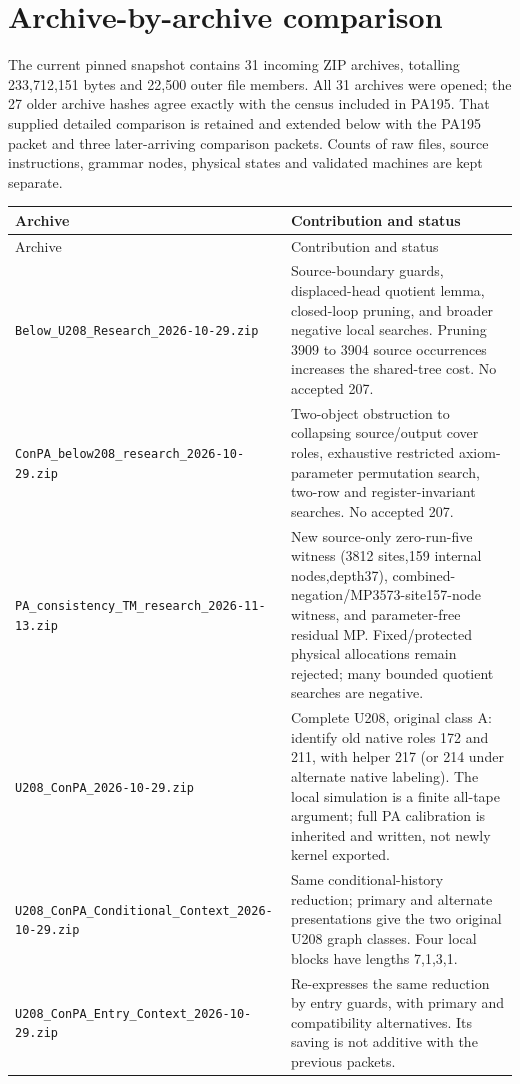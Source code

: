 \section{Archive-by-archive comparison}
The current pinned snapshot contains 31 incoming ZIP archives, totalling
233,712,151 bytes and 22,500 outer file members. All 31 archives were opened;
the 27 older archive hashes agree exactly with the census included in PA195.
That supplied detailed comparison is retained and extended below with the
PA195 packet and three later-arriving comparison packets. Counts of raw files,
source instructions, grammar nodes, physical states and validated machines are
kept separate.

\small
\begin{longtable}{p{}p{}}
\toprule
Archive & Contribution and status\\
\midrule
\endfirsthead
\toprule
Archive & Contribution and status\\
\midrule
\endhead
\nolinkurl{Below_U208_Research_2026-10-29.zip} & Source-boundary guards, displaced-head quotient lemma, closed-loop pruning, and broader negative local searches. Pruning 3909 to 3904 source occurrences increases the shared-tree cost. No accepted 207.\\[4pt]
\nolinkurl{ConPA_below208_research_2026-10-29.zip} & Two-object obstruction to collapsing source/output cover roles, exhaustive restricted axiom-parameter permutation search, two-row and register-invariant searches. No accepted 207.\\[4pt]
\nolinkurl{PA_consistency_TM_research_2026-11-13.zip} & New source-only zero-run-five witness (3812 sites,159 internal nodes,depth37), combined-negation/MP3573-site157-node witness, and parameter-free residual MP. Fixed/protected physical allocations remain rejected; many bounded quotient searches are negative.\\[4pt]
\nolinkurl{U208_ConPA_2026-10-29.zip} & Complete U208, original class A: identify old native roles 172 and 211, with helper 217 (or 214 under alternate native labeling). The local simulation is a finite all-tape argument; full PA calibration is inherited and written, not newly kernel exported.\\[4pt]
\nolinkurl{U208_ConPA_Conditional_Context_2026-10-29.zip} & Same conditional-history reduction; primary and alternate presentations give the two original U208 graph classes. Four local blocks have lengths 7,1,3,1.\\[4pt]
\nolinkurl{U208_ConPA_Entry_Context_2026-10-29.zip} & Re-expresses the same reduction by entry guards, with primary and compatibility alternatives. Its saving is not additive with the previous packets.\\[4pt]

\end{longtable}

